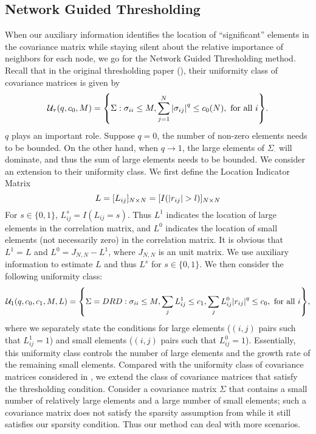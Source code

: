\subsection{Network Guided Thresholding}{\label{framework1}}
When our auxiliary information identifies the location of “significant” elements in the covariance matrix while staying silent about the relative importance of neighbors for each node, we go for the Network Guided Thresholding method.  Recall that in the original thresholding paper (\cite{bickel2008CovarianceRegularization}), their uniformity class of covariance matrices is given by
\begin{equation*}
    \mathcal{U}_{\tau}(q, c_{0} , M) = \Bqty{\Sigma: \sigma_{ii} \leq M, \sum_{j=1}^{N} \abs{\sigma_{ij}}^{q} \leq c_{0}(N), \mbox{ for all } i}.
\end{equation*}
\(q\) plays an important role. Suppose \(q = 0\), the number of non-zero elements needs to be bounded. On the other hand, when \(q \to 1\), the large elements of \(\Sigma_{\cdot}\) will dominate, and thus the sum of large elements needs to be bounded. We consider an extension to their uniformity class.  We first define the Location Indicator Matrix
\begin{equation}
    L = [L_{ij}]_{N\times N} = [ I(\abs{r_{ij}} > l)]_{N\times N}
    \label{L aux_set}
\end{equation}
For $s\in \{0, 1\}$, $L_{ij}^s = I(L_{ij}=s)$. Thus $L^1$ indicates the location of large elements in the correlation matrix, and $L^0$ indicates the location of small elements (not necessarily zero) in the correlation matrix. It is obvious that $L^1=L$ and $L^0=J_{N,N}-L^1$, where $J_{N,N}$ is an unit matrix. We use auxiliary information to estimate $L$ and thus $L^s$ for $s\in \{0, 1\}$. We then consider the following uniformity class:
\begin{align*}
    \mathcal{U}_1 (q, c_{0}, c_{1}, M, L) = \Bqty{\Sigma = DRD : \sigma_{ii} \leq M, \sum_{j} L_{ij}^{1} \leq c_{1}, \sum_{j} L_{ij}^{0}\abs{r_{ij}}^{q} \leq c_{0}, \mbox{ for all } i},
\end{align*}
where we separately state the conditions for large elements ($(i,j)$ pairs such that $L_{ij}^{1}=1$) and small elements ($(i,j)$ pairs such that $L_{ij}^{0}=1$). Essentially, this uniformity class controls the number of large elements and the growth rate of the remaining small elements. Compared with the uniformity class of covariance matrices considered in \cite{bickel2008CovarianceRegularization}, we extend the class of covariance matrices that satisfy the thresholding condition. 
Consider a covariance matrix \(\Sigma\) that contains a small number of relatively large elements and a large number of small elements; such a covariance matrix does not satisfy the sparsity assumption from \cite{bickel2008CovarianceRegularization} while it still satisfies our sparsity condition. Thus our method can deal with more scenarios.

